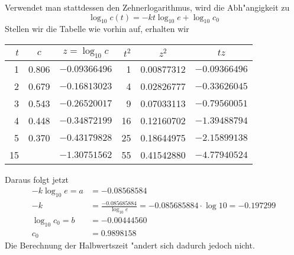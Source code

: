 \begin{loesung}
Verwendet man stattdessen den Zehnerlogarithmus, wird die Abh"angigkeit
zu
$$
\log_{10} c(t)=-kt\log_{10}e+\log_{10}c_0
$$
Stellen wir die Tabelle wie vorhin auf, erhalten wir
\begin{center}
\begin{tabular}{rccrcc}
$t$&$c$&$z=\log_{10} c$&$t^2$&$z^2$&$tz$\\
\hline
1&0.806&$-0.09366496$&1&0.00877312&$-0.09366496$\\
2&0.679&$-0.16813023$&4&0.02826777&$-0.33626045$\\
3&0.543&$-0.26520017$&9&0.07033113&$-0.79560051$\\
4&0.448&$-0.34872199$&16&0.12160702&$-1.39488794$\\
5&0.370&$-0.43179828$&25&0.18644975&$-2.15899138$\\
\hline
15&    &$-1.30751562$&55&0.41542880&$-4.77940524$\\
\end{tabular}
\end{center}
Daraus folgt jetzt
\begin{align*}
-k\log_{10}e=a&=-0.08568584\\
-k&=\frac{-0.085685884}{\log_{10}e}=-0.085685884\cdot \log 10
=
-0.197299
\\
\log_{10}c_0=b&=-0.00444560\\
c_0&=0.9898158
\end{align*}
Die Berechnung der Halbwertszeit "andert sich dadurch jedoch
nicht.
\end{loesung}

